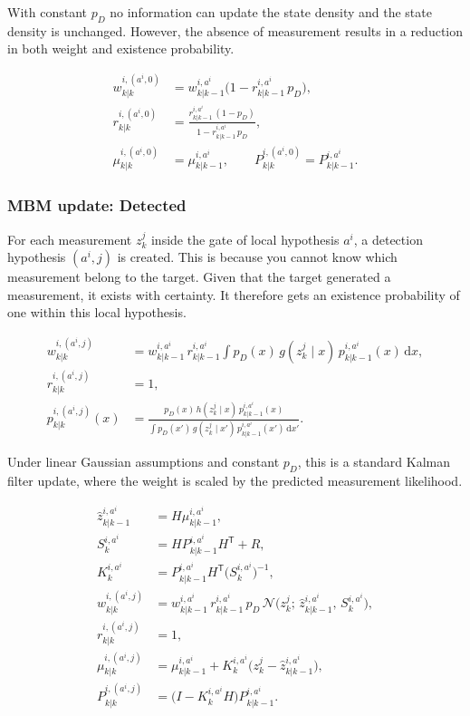 With constant $p_D$ no information can update the state density and the state density is unchanged. However, the absence of measurement results in a reduction in both weight and existence probability.

\begin{align*}
  w^{i,(a^i,0)}_{k|k} &= w^{i,a^i}_{k|k-1} \big(1 - r^{i,a^i}_{k|k-1}\, p_D\big), \\
  r^{i,(a^i,0)}_{k|k} &= \frac{r^{i,a^i}_{k|k-1}\,(1 - p_D)}{1 - r^{i,a^i}_{k|k-1}\, p_D}, \\
  \mu^{i,(a^i,0)}_{k|k} &= \mu^{i,a^i}_{k|k-1}, \qquad
  P^{i,(a^i,0)}_{k|k} = P^{i,a^i}_{k|k-1}.
\end{align*}
\medskip

\subsubsection{MBM update: Detected}
For each measurement $z^j_k$ inside the gate of local hypothesis $a^i$, a detection hypothesis $(a^i, j)$ is created. This is because you cannot know which measurement belong to the target. Given that the target generated a measurement, it exists with certainty. It therefore gets an existence probability of one within this local hypothesis.

\begin{align}
  w^{i,(a^i,j)}_{k|k} &= w^{i,a^i}_{k|k-1}\, r^{i,a^i}_{k|k-1}
    \int p_D(x)\, g(z^j_k \mid x)\, p^{i,a^i}_{k|k-1}(x)\,\mathrm{d}x, \label{eq:upd_mbm_d_w}\\
  r^{i,(a^i,j)}_{k|k} &= 1, \label{eq:upd_mbm_d_r}\\
  p^{i,(a^i,j)}_{k|k}(x) &= \frac{p_D(x)\, h(z^j_k \mid x)\, p^{i,a^i}_{k|k-1}(x)}
    {\int p_D(x')\, g(z^j_k \mid x')\, p^{i,a^i}_{k|k-1}(x')\,\mathrm{d}x'}. \label{eq:upd_mbm_d_p}
\end{align}

Under linear Gaussian assumptions and constant $p_D$, this is a standard Kalman filter update, where the weight is scaled by the predicted measurement likelihood.

\begin{align*}
  \hat z^{i,a^i}_{k|k-1} &= H \mu^{i,a^i}_{k|k-1}, \\
  S^{i,a^i}_k &= H P^{i,a^i}_{k|k-1} H^{\mathsf{T}} + R, \\
  K^{i,a^i}_k &= P^{i,a^i}_{k|k-1} H^{\mathsf{T}} \big(S^{i,a^i}_k\big)^{-1}, \\
  w^{i,(a^i,j)}_{k|k} &= w^{i,a^i}_{k|k-1}\, r^{i,a^i}_{k|k-1}\, p_D\,
    \mathcal{N}\big(z^j_k;\, \hat z^{i,a^i}_{k|k-1},\, S^{i,a^i}_k\big), \\
  r^{i,(a^i,j)}_{k|k} &= 1, \\
  \mu^{i,(a^i,j)}_{k|k} &= \mu^{i,a^i}_{k|k-1} + K^{i,a^i}_k \big(z^j_k - \hat z^{i,a^i}_{k|k-1}\big), \\
  P^{i,(a^i,j)}_{k|k} &= \big(I - K^{i,a^i}_k H\big) P^{i,a^i}_{k|k-1}.
\end{align*}


